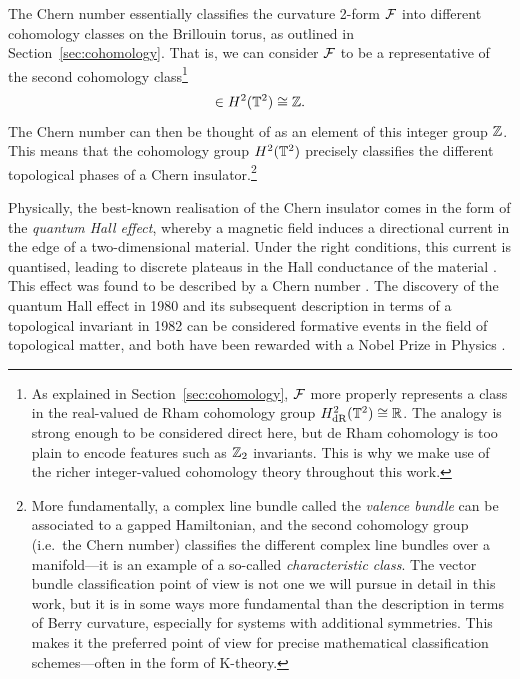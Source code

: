 The Chern number essentially classifies the curvature 2-form $\mathcal{F}$ into different cohomology classes on the Brillouin torus, as outlined in Section~\ref{sec:cohomology}. That is, we can consider $\mathcal{F}$ to be a representative of the second cohomology class\footnote{
	As explained in Section~\ref{sec:cohomology}, $\mathcal{F}$ more properly represents a class in the real-valued de Rham cohomology group $H_{\rm dR}^2(\mathbb{T}^2)\cong\mathbb{R}$. The analogy is strong enough to be considered direct here, but de Rham cohomology is too plain to encode features such as $\mathbb{Z}_2$ invariants. This is why we make use of the richer integer-valued cohomology theory throughout this work.}
\begin{equation*}
	[\Fc] \in H^2(\T^2) \cong \Z.
\end{equation*}
The Chern number can then be thought of as an element of this integer group $\mathbb{Z}$. This means that the cohomology group $H^2(\mathbb{T}^2)$ precisely classifies the different topological phases of a Chern insulator.\footnote{
	More fundamentally, a complex line bundle called the \emph{valence bundle} can be associated to a gapped Hamiltonian, and the second cohomology group (i.e.\ the Chern number) classifies the different complex line bundles over a manifold---it is an example of a so-called \emph{characteristic class}. The vector bundle classification point of view is not one we will pursue in detail in this work, but it is in some ways more fundamental than the description in terms of Berry curvature, especially for systems with additional symmetries. This makes it the preferred point of view for precise mathematical classification schemes---often in the form of K-theory.}

Physically, the best-known realisation of the Chern insulator comes in the form of the \emph{quantum Hall effect}, whereby a magnetic field induces a directional current in the edge of a two-dimensional material. Under the right conditions, this current is quantised, leading to discrete plateaus in the Hall conductance of the material \cite{vKDP_QHE,vonKlitzing_QHE}. This effect was found to be described by a Chern number \cite{TKNN}. The discovery of the quantum Hall effect in 1980 and its subsequent description in terms of a topological invariant in 1982 can be considered formative events in the field of topological matter, and both have been rewarded with a Nobel Prize in Physics \cite{Nobel_1985,Nobel_2016}.

